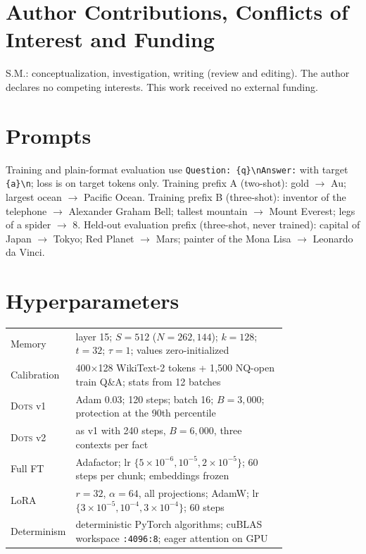 \documentclass[journal]{IEEEtran}
\newcommand{\sys}{\textsc{Dots}}
\begin{document}
\section*{Author Contributions, Conflicts of Interest and Funding}
S.M.: conceptualization, investigation, writing (review and editing). The author declares no competing interests. This work received no external funding.




\appendix
\section{Prompts}
\label{app:prompts}
Training and plain-format evaluation use \texttt{Question: \{q\}\textbackslash nAnswer:} with target \texttt{ \{a\}\textbackslash n}; loss is on target tokens only.
Training prefix A (two-shot): gold $\rightarrow$ Au; largest ocean $\rightarrow$ Pacific Ocean.
Training prefix B (three-shot): inventor of the telephone $\rightarrow$ Alexander Graham Bell; tallest mountain $\rightarrow$ Mount Everest; legs of a spider $\rightarrow$ 8.
Held-out evaluation prefix (three-shot, never trained): capital of Japan $\rightarrow$ Tokyo; Red Planet $\rightarrow$ Mars; painter of the Mona Lisa $\rightarrow$ Leonardo da Vinci.

\section{Hyperparameters}
\noindent\begin{tabular}{@{}lp{0.78\linewidth}@{}}
\toprule
Memory & layer 15; $S=512$ ($N=262{,}144$); $k=128$; $t=32$; $\tau=1$; values zero-initialized \\
Calibration & 400$\times$128 WikiText-2 tokens + 1{,}500 NQ-open train Q\&A; stats from 12 batches \\
\sys{} v1 & Adam 0.03; 120 steps; batch 16; $B=3{,}000$; protection at the 90th percentile \\
\sys{} v2 & as v1 with 240 steps, $B=6{,}000$, three contexts per fact \\
Full FT & Adafactor; lr $\{5\!\times\!10^{-6}, 10^{-5}, 2\!\times\!10^{-5}\}$; 60 steps per chunk; embeddings frozen \\
LoRA & $r=32$, $\alpha=64$, all projections; AdamW; lr $\{3\!\times\!10^{-5}, 10^{-4}, 3\!\times\!10^{-4}\}$; 60 steps \\
Determinism & deterministic PyTorch algorithms; cuBLAS workspace \texttt{:4096:8}; eager attention on GPU \\
\bottomrule
\end{tabular}
\end{document}
